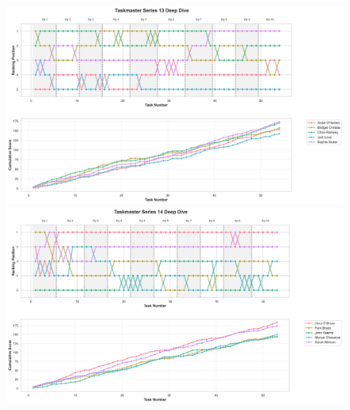 \documentclass[10pt,letterpaper]{article}
\begin{document}
\begin{figure}[!h]
\centering
\includegraphics[width=\linewidth]{supfigure/series_13_deep_dive.png}
\includegraphics[width=\linewidth]{supfigure/series_14_deep_dive.png}
\end{figure}
\FloatBarrier
\clearpage
\end{document}
